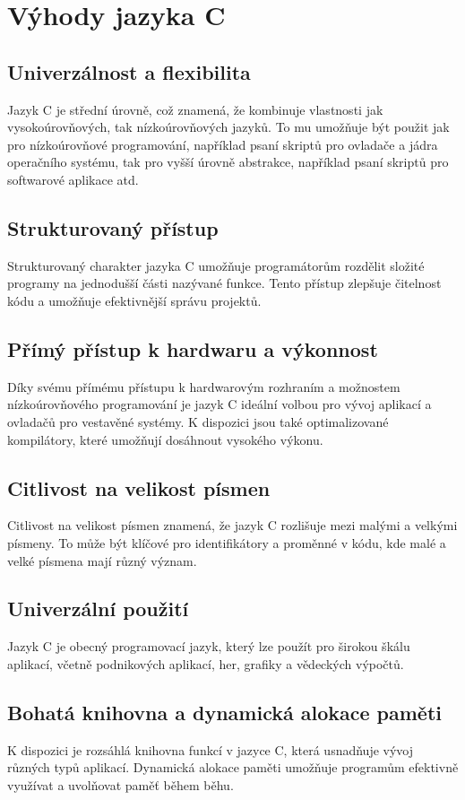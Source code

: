 \documentclass{article}
\begin{document}
	
\section*{Výhody jazyka C}

	
	\subsection*{Univerzálnost a flexibilita}
	Jazyk C je střední úrovně, což znamená, že kombinuje vlastnosti jak vysokoúrovňových, tak nízkoúrovňových jazyků. To mu umožňuje být použit jak pro nízkoúrovňové programování, například psaní skriptů pro ovladače a jádra operačního systému, tak pro vyšší úrovně abstrakce, například psaní skriptů pro softwarové aplikace atd.
	
	\subsection*{Strukturovaný přístup}
	Strukturovaný charakter jazyka C umožňuje programátorům rozdělit složité programy na jednodušší části nazývané funkce. Tento přístup zlepšuje čitelnost kódu a umožňuje efektivnější správu projektů.
	
	\subsection*{Přímý přístup k hardwaru a výkonnost}
	Díky svému přímému přístupu k hardwarovým rozhraním a možnostem nízkoúrovňového programování je jazyk C ideální volbou pro vývoj aplikací a ovladačů pro vestavěné systémy. K dispozici jsou také optimalizované kompilátory, které umožňují dosáhnout vysokého výkonu.
	
	\subsection*{Citlivost na velikost písmen}
	Citlivost na velikost písmen znamená, že jazyk C rozlišuje mezi malými a velkými písmeny. To může být klíčové pro identifikátory a proměnné v kódu, kde malé a velké písmena mají různý význam.
	
	\subsection*{Univerzální použití}
	Jazyk C je obecný programovací jazyk, který lze použít pro širokou škálu aplikací, včetně podnikových aplikací, her, grafiky a vědeckých výpočtů.
	
	\subsection*{Bohatá knihovna a dynamická alokace paměti}
	K dispozici je rozsáhlá knihovna funkcí v jazyce C, která usnadňuje vývoj různých typů aplikací. Dynamická alokace paměti umožňuje programům efektivně využívat a uvolňovat paměť během běhu.
	
\end{document}
